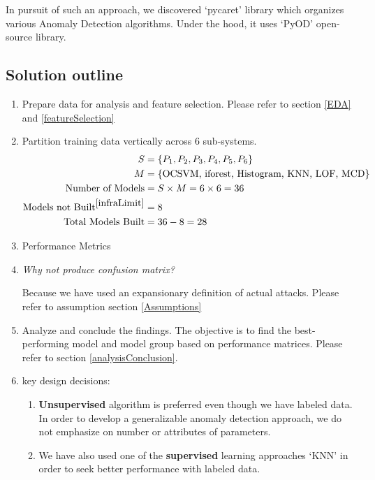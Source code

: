 \documentclass{article}
\begin{document}
In pursuit of such an approach, we discovered `pycaret' library which organizes various Anomaly Detection algorithms. Under the hood, it uses `PyOD' open-source library. \par

\subsection{Solution outline}
\begin{enumerate}
    \item Prepare data for analysis and feature selection. Please refer to section \ref{EDA} and \ref{featureSelection}
    \item Partition training data vertically across 6 sub-systems.
        \begin{equation}
            \begin{aligned}
                S &= \{P_1, P_2, P_3, P_4, P_5, P_6\} \\
                M &= \{\text{OCSVM, iforest, Histogram, KNN, LOF, MCD}\} \\
                \text{Number of Models} &= S \times M = 6 \times 6 = 36 \\
                \text{Models not Built}^{\ref{infraLimit}} &= 8 \\
                \text{Total Models Built} &= 36 - 8 = 28
            \end{aligned}
        \end{equation} 
    \item Performance Metrics 
    \item \textit{Why not produce confusion matrix?} \par
    Because we have used an expansionary definition of actual attacks. Please refer to assumption section \ref{Assumptions}

    \item Analyze and conclude the findings. The objective is to find the best-performing model and model group based on performance matrices. Please refer to section \ref{analysisConclusion}.
    
    \item key design decisions:
    \begin{enumerate}
        \item \textbf{Unsupervised} algorithm is preferred even though we have labeled data. In order to develop a generalizable anomaly detection approach, we do not emphasize on number or attributes of parameters.
        \item We have also used one of the \textbf{supervised} learning approaches `KNN' in order to seek better performance with labeled data. 
    \end{enumerate}
    
\end{enumerate}
\end{document}
